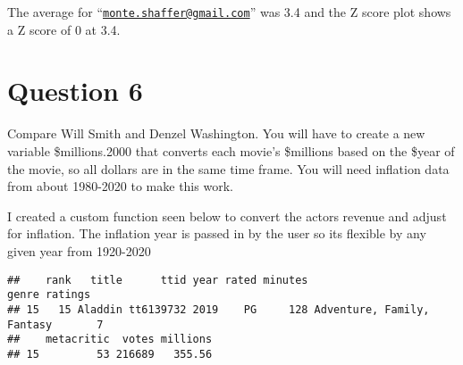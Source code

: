 \documentclass{article}
\newenvironment{Shaded}{\begin{snugshade}}{\end{snugshade}}
\newcommand{\CommentTok}[1]{\textcolor[rgb]{0.56,0.35,0.01}{\textit{#1}}}
\newcommand{\FloatTok}[1]{\textcolor[rgb]{0.00,0.00,0.81}{#1}}
\newcommand{\KeywordTok}[1]{\textcolor[rgb]{0.13,0.29,0.53}{\textbf{#1}}}
\newcommand{\NormalTok}[1]{#1}
\newcommand{\OperatorTok}[1]{\textcolor[rgb]{0.81,0.36,0.00}{\textbf{#1}}}
\newcommand{\StringTok}[1]{\textcolor[rgb]{0.31,0.60,0.02}{#1}}
\begin{document}
The average for
``\href{mailto:monte.shaffer@gmail.com}{\nolinkurl{monte.shaffer@gmail.com}}''
was 3.4 and the Z score plot shows a Z score of 0 at 3.4.

\newpage

\hypertarget{question-6}{%
\section{Question 6}\label{question-6}}

Compare Will Smith and Denzel Washington. You will have to create a new
variable \$millions.2000 that converts each movie's \$millions based on
the \$year of the movie, so all dollars are in the same time frame. You
will need inflation data from about 1980-2020 to make this work.

I created a custom function seen below to convert the actors revenue and
adjust for inflation. The inflation year is passed in by the user so its
flexible by any given year from 1920-2020

\begin{Shaded}
\end{Shaded}

\begin{verbatim}
##    rank   title      ttid year rated minutes                      genre ratings
## 15   15 Aladdin tt6139732 2019    PG     128 Adventure, Family, Fantasy       7
##    metacritic  votes millions
## 15         53 216689   355.56
\end{verbatim}

\begin{Shaded}
\end{Shaded}
\end{document}

